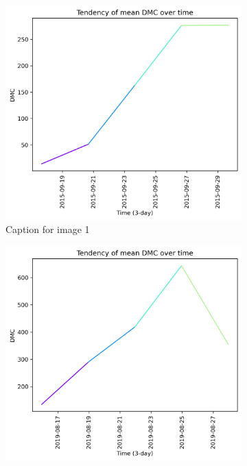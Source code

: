 \begin{figure}[h]
    \centering
    \caption{Caption for the whole figure}
    \begin{subfigure}{0.3\textwidth}
        \centering
        \includegraphics[width=\textwidth]{graphs/2015/15daysprior/2015_15daysprior_tendency_graph_DMC.png}
        \caption{Caption for image 1}
        \label{fig:img1}
    \end{subfigure}
    \hfill
    \begin{subfigure}{0.3\textwidth}
        \centering
        \includegraphics[width=\textwidth]{graphs/2019/15daysprior/2019_15daysprior_tendency_graph_DMC.png}

\end{subfigure}
\end{figure}
